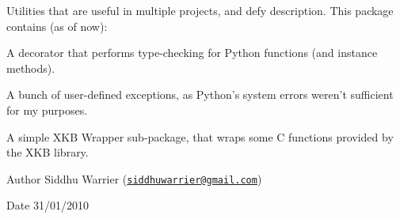 Utilities that are useful in multiple projects, and defy description. This package contains (as of now): \begin{DoxyItemize}
\item A decorator that performs type-\/checking for Python functions (and instance methods). \item A bunch of user-\/defined exceptions, as Python's system errors weren't sufficient for my purposes. \item A simple XKB Wrapper sub-\/package, that wraps some C functions provided by the XKB library.\end{DoxyItemize}
\begin{DoxyAuthor}{Author}
Siddhu Warrier (\href{mailto:siddhuwarrier@gmail.com}{\tt siddhuwarrier@gmail.com}) 
\end{DoxyAuthor}
\begin{DoxyDate}{Date}
31/01/2010 
\end{DoxyDate}
